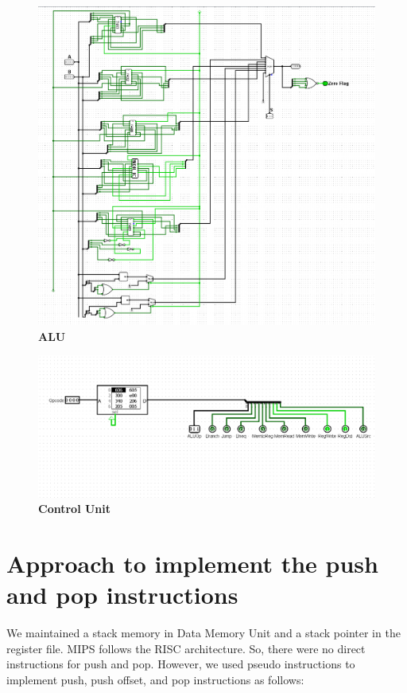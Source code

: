 \documentclass[12]{article}
\begin{document}
\begin{figure}[b]
    \centering
    \includegraphics[scale = 0.75]{Images/ALU.png}
    \caption{\textbf{ALU}}
\end{figure}

\begin{figure}[t]
    \centering
    \includegraphics[scale = 0.6]{Images/Control Unit.png}
    \caption{\textbf{Control Unit}}
\end{figure}
\clearpage

\section{Approach to implement the push and pop instructions}

We maintained a stack memory in Data Memory Unit and a stack pointer in the register file. MIPS follows the RISC architecture. So, there were no direct instructions for push and pop. However, we used pseudo instructions to implement push, push offset, and pop instructions as follows:
\end{document}
